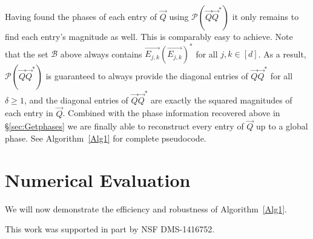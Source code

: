\documentclass[]{spie}  %
\def \vec{\overrightarrow}
\begin{document}
Having found the phases of each entry of $\vec{Q}$ using $\mathcal{P} ( \vec{Q} \vec{Q}^* )$ it only remains to find each entry's magnitude as well.  This is comparably easy to achieve.  Note that the set $\mathcal{B}$ above always contains $\vec{E_{j,k}} (\vec{E_{j,k}} )^*$ for all $j,k \in [d]$.  As a result, $\mathcal{P} ( \vec{Q} \vec{Q}^* )$ is guaranteed to always provide the diagonal entries of $\vec{Q} \vec{Q}^*$ for all $\delta \geq 1$, and the diagonal entries of $\vec{Q} \vec{Q}^*$ are exactly the squared magnitudes of each entry in $\vec{Q}$.  
Combined with the phase information recovered above in \S\ref{sec:Getphases} we are finally able to reconstruct every entry of $\vec{Q}$ up to a global phase.  See Algorithm~\ref{Alg1} for complete pseudocode.


\section{Numerical Evaluation}
\label{sec:Numerics}

We will now demonstrate the efficiency and robustness of Algorithm~\ref{Alg1}.


\acknowledgments %
 
This work was supported in part by NSF DMS-1416752.%

\end{document}
